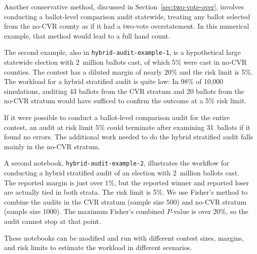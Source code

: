\documentclass[runningheads]{llncs}
\begin{document}
Another conservative method, discussed in Section~\ref{sec:two-vote-over},
involves conducting a ballot-level comparison audit statewide,
treating any ballot selected from the no-CVR county as if it had a two-vote overstatement.
In this numerical example, that method would lead to a full hand count.

The second example, also in \texttt{hybrid-audit-example-1}, 
is a hypothetical large statewide election with 
2~million ballots cast, of which 5\% were cast in no-CVR counties.
The contest has a diluted margin of nearly $20\%$ and the risk limit is 5\%.
The workload for a hybrid stratified audit is quite low:
In 98\% of 10,000 simulations, auditing 43 ballots from the 
CVR stratum and 20 ballots from the no-CVR stratum
would have sufficed to confirm the outcome at a 5\% risk limit.

If it were possible to conduct a ballot-level comparison audit for the entire contest, 
an audit at risk limit 5\% could terminate after examining 31~ballots if it found no errors.
The additional work needed to do the hybrid stratified audit falls mainly in the no-CVR stratum.

A second notebook, \texttt{hybrid-audit-example-2}, illustrates the 
workflow for conducting a hybrid stratified audit of an election with 2~million ballots cast.
The reported margin is just over $1\%$, but the reported winner
and reported loser are actually tied in both strata.  
The risk limit is 5\%.
We use Fisher's method to combine the audits in the CVR stratum (sample size 500) 
and no-CVR stratum (sample size 1000).
The maximum Fisher's combined $P$-value is over 20\%, so the audit cannot stop at that point.

These notebooks can be modified and run with different contest sizes, margins, and risk limits to
estimate the workload in different scenarios.


\end{document}
